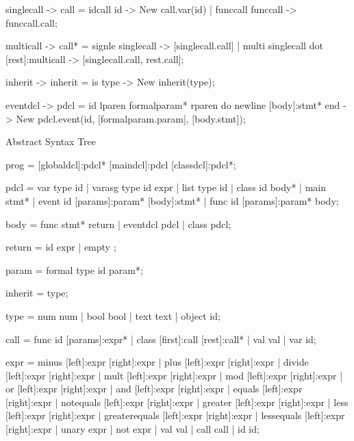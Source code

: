     singlecall  {-> call}   =   {idcall} id                                             {-> New call.var(id)}
                            |   {funccall} funccall                                     {-> funccall.call};

    multicall   {-> call*}  =   {signle} singlecall                                     {-> [singlecall.call]}
                            |   {multi} singlecall dot [rest]:multicall                 {-> [singlecall.call, rest.call]};

    inherit     {-> inherit}    =    is type                                            {-> New inherit(type)};

    eventdcl    {-> pdcl}  =   id lparen formalparam* rparen do newline [body]:stmt* end          {-> New pdcl.event(id, [formalparam.param], [body.stmt])};


Abstract Syntax Tree

    prog        =   [globaldcl]:pdcl* [maindcl]:pdcl [classdcl]:pdcl*;

    pdcl        =   {var} type id
                |   {varasg} type id expr
                |   {list} type id
                |   {class} id body*
                |   {main} stmt*
                |   {event} id [params]:param* [body]:stmt*
                |   {func} id [params]:param* body;

    body        =   {func} stmt* return
                |   {eventdcl} pdcl
                |   {class} pdcl;

    return      =   {id} expr
                |   {empty} ;

    param       =   {formal} type id param*;

    inherit     =   type;

    type        =   {num} num
                |   {bool} bool
                |   {text} text
                |   {object} id;

    call        =   {func} id [params]:expr*
                |   {class} [first]:call [rest]:call*
                |   {val} val
                |   {var} id;

    expr        =   {minus} [left]:expr [right]:expr
                |   {plus} [left]:expr [right]:expr
                |   {divide} [left]:expr [right]:expr
                |   {mult} [left]:expr [right]:expr
                |   {mod} [left]:expr [right]:expr
                |   {or} [left]:expr [right]:expr
                |   {and} [left]:expr [right]:expr
                |   {equals} [left]:expr [right]:expr
                |   {notequals} [left]:expr [right]:expr
                |   {greater} [left]:expr [right]:expr
                |   {less} [left]:expr [right]:expr
                |   {greaterequals} [left]:expr [right]:expr
                |   {lessequals} [left]:expr [right]:expr
                |   {unary} expr
                |   {not} expr
                |   {val} val
                |   {call} call
                |   {id} id;

